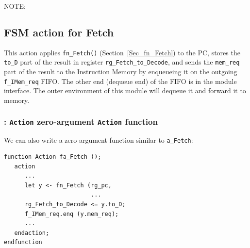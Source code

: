 
NOTE: 


\subsection{FSM action for Fetch}


This action applies \verb|fn_Fetch()| (Section~\ref{Sec_fn_Fetch}) to
the PC, stores the \verb|to_D| part of the result in register
\verb|rg_Fetch_to_Decode|, and sends the \verb|mem_req| part of the
result to the Instruction Memory by enqueueing it on the outgoing
\verb|f_IMem_req| FIFO.  The other end (dequeue end) of the FIFO is in
the module interface.  The outer environment of this module will
dequeue it and forward it to memory.


\subsubsection{{\BSV}: {\tt Action} {\vs} zero-argument {\tt Action} function}

We can also write a zero-argument function similar to \verb|a_Fetch|:

{\footnotesize
\begin{Verbatim}[frame=single]
function Action fa_Fetch ();
   action
      ...
      let y <- fn_Fetch (rg_pc,
                         ...
      rg_Fetch_to_Decode <= y.to_D;
      f_IMem_req.enq (y.mem_req);
      ...
   endaction;
endfunction
\end{Verbatim}
}

